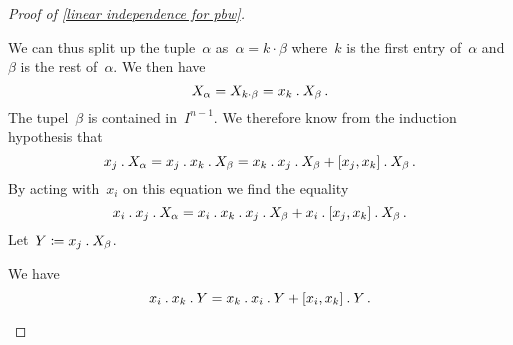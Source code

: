 \begin{proof}[Proof of \cref{linear independence for pbw}]
\begin{description}
      We can thus split up the tuple~$\alpha$ as~$\alpha = k \cdot \beta$ where~$k$ is the first entry of~$\alpha$ and~$\beta$ is the rest of~$\alpha$.
      We then have
      \[
        X_\alpha
        =
        X_{k \cdot \beta}
        =
        x_k \mathbin{.} X_\beta \,.
      \]
      The tupel~$\beta$ is contained in~$I^{n-1}$.
      We therefore know from the induction hypothesis that
      \[
        x_j \mathbin{.} X_\alpha
        =
        x_j \mathbin{.} x_k \mathbin{.} X_\beta
        =
        x_k \mathbin{.} x_j \mathbin{.} X_\beta 
        + [x_j, x_k] \mathbin{.} X_\beta  \,.
      \]
      By acting with~$x_i$ on this equation we find the equality
      \begin{equation}
        \label{long equation}
        x_i \mathbin{.} x_j \mathbin{.} X_\alpha
        =
        x_i \mathbin{.} x_k \mathbin{.} x_j \mathbin{.} X_\beta
        + x_i \mathbin{.} [x_j,x_k] \mathbin{.} X_\beta \,.
      \end{equation}
      Let~$Y \coloneqq x_j \mathbin{.} X_\beta$.

      \begin{claim}
        We have
        \begin{equation}
          \label{wanted equation for pbw}
          x_i \mathbin{.} x_k \mathbin{.} Y
          =
          x_k \mathbin{.} x_i \mathbin{.} Y
          + [x_i, x_k] \mathbin{.} Y \,.
        \end{equation}
      \end{claim}


\end{description}
\end{proof}
